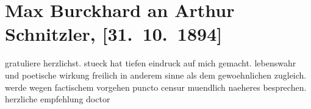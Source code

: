 

         
         \renewcommand{\erwaehntePersonen}{Personen: Max Eugen Burckhard}
         \renewcommand{\erwaehnteOrte}{Orte: Wien}
         \renewcommand{\erwaehnteWerke}{Werke: Liebelei. Schauspiel in drei Akten}
               \section[Max Burckhard an Arthur Schnitzler, {[}31. 10. 1894{]}]{ Max Burckhard an Arthur Schnitzler, {[}31. 10. 1894{]}}\nopagebreak{}\rehead{ }\begin{ledgroupsized}[t]{13cm}\normalsize\beginnumbering \toendnotes[C]{\smallbreak\pagebreak[2]} 
\toendnotes[C]{\smallbreak}\pstart
           \noindent{}{\pb}gratuliere herzlichst. stueck hat tiefen eindruck auf
               mich gemacht. lebenswahr und poetische wirkung freilich in anderem sinne als dem
               gewoehnlichen zugleich. werde wegen factischem vorgehen puncto censur muendlich
               naeheres besprechen. herzliche empfehlung \spacefill\mbox{doctor \label{T_L00395-1v}\label{T_L00395-1h}}\pend
           
         
         \endnumbering{}\end{ledgroupsized}  \newcommand{\dateiname}{L00395}\newcommand{\titel}{Max Burckhard an Arthur Schnitzler, [31. 10. 1894]}\newcommand{\editorInnen}{Martin Anton Müller und Gerd-Hermann Susen}
      